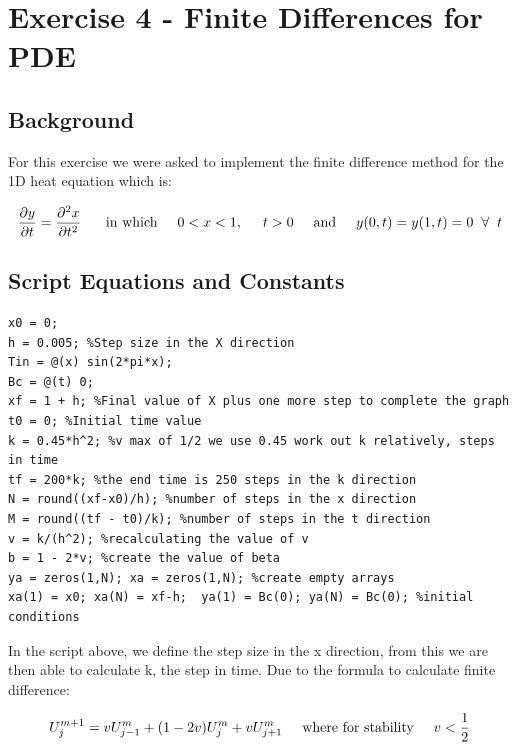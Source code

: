 \documentclass[11pt,a4paper]{article}
\begin{document}
\section{Exercise 4 - Finite Differences for PDE}\vspace{-1mm}
\subsection{Background}

For this exercise we were asked to implement the finite difference method for the 1D heat equation which is:

\[\frac{\partial y}{\partial t} = \frac{\partial^2 x}{\partial t^2}\ \hspace{5mm} \text{in which} \hspace{5mm} 0 < x < 1, \hspace{5mm} t > 0 \hspace{5mm} \text{and} \hspace{5mm} y(0,t) = y(1,t) = 0 \hspace{2mm} \forall \hspace{2mm} t\]

\subsection{Script Equations and Constants}

\begin{verbatim}
x0 = 0;
h = 0.005; %Step size in the X direction
Tin = @(x) sin(2*pi*x);
Bc = @(t) 0;
xf = 1 + h; %Final value of X plus one more step to complete the graph
t0 = 0; %Initial time value
k = 0.45*h^2; %v max of 1/2 we use 0.45 work out k relatively, steps in time
tf = 200*k; %the end time is 250 steps in the k direction
N = round((xf-x0)/h); %number of steps in the x direction
M = round((tf - t0)/k); %number of steps in the t direction
v = k/(h^2); %recalculating the value of v
b = 1 - 2*v; %create the value of beta
ya = zeros(1,N); xa = zeros(1,N); %create empty arrays
xa(1) = x0; xa(N) = xf-h;  ya(1) = Bc(0); ya(N) = Bc(0); %initial conditions
\end{verbatim}

In the script above, we define the step size in the x direction, from this we are then able to calculate k, the step in time. Due to the formula to calculate finite difference:

\[U^{m+1}_j = vU^m_{j-1} +(1-2v)U^m_{j}+vU^m_{j+1} \hspace{5mm} \text{where for stability} \hspace{5mm} v < \frac{1}{2}\]
\end{document}
